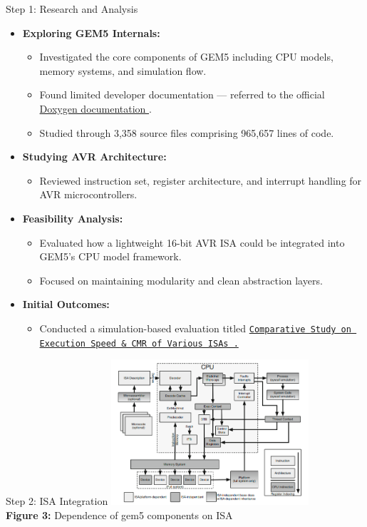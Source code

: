 \begin{frame}{Step 1: Research and Analysis}
  \begin{itemize}
    \item \textbf{Exploring GEM5 Internals:} 
      \begin{itemize}
        \item Investigated the core components of GEM5 including CPU models, memory systems, and simulation flow.
        \item Found limited developer documentation — referred to the official \href{https://doxygen.gem5.org/develop/index.html}{Doxygen documentation \faLink}.
        \item Studied through 3,358 source files comprising 965,657 lines of code.
      \end{itemize}

    \item \textbf{Studying AVR Architecture:}
      \begin{itemize}
        \item Reviewed instruction set, register architecture, and interrupt handling for AVR microcontrollers.
      \end{itemize}

    \item \textbf{Feasibility Analysis:}
      \begin{itemize}
        \item Evaluated how a lightweight 16-bit AVR ISA could be integrated into GEM5’s CPU model framework.
        \item Focused on maintaining modularity and clean abstraction layers.
      \end{itemize}

    \item \textbf{Initial Outcomes:}
      \begin{itemize}
        \item Conducted a simulation-based evaluation titled \href{https://drive.google.com/file/d/13ZroHuWGLApYXLkeWA3SBIlMh6KzfCqq/view?usp=sharing}{\texttt{Comparative Study on Execution Speed \& CMR of Various ISAs \faLink.}} 
      \end{itemize}
  \end{itemize}
\end{frame}


\begin{frame}{Step 2: ISA Integration}
  \centering
  \includegraphics[width=0.55\textwidth]{images/impl.png}\\
  \textbf{Figure 3: }Dependence of gem5 components on ISA
\end{frame}


